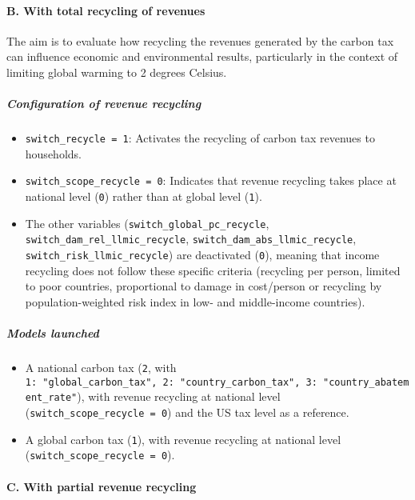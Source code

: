 \documentclass[
]{article}
\providecommand{\tightlist}{%
  \setlength{\itemsep}{0pt}\setlength{\parskip}{0pt}}
\begin{document}
\paragraph{B. With total recycling of
revenues}\label{b.-with-total-recycling-of-revenues}

The aim is to evaluate how recycling the revenues generated by the
carbon tax can influence economic and environmental results,
particularly in the context of limiting global warming to 2 degrees
Celsius.

\subparagraph{Configuration of revenue
recycling}\label{configuration-of-revenue-recycling}

\begin{itemize}
\tightlist
\item
  \texttt{switch\_recycle\ =\ 1}: Activates the recycling of carbon tax
  revenues to households.
\item
  \texttt{switch\_scope\_recycle\ =\ 0}: Indicates that revenue
  recycling takes place at national level (\texttt{0}) rather than at
  global level (\texttt{1}).
\item
  The other variables (\texttt{switch\_global\_pc\_recycle},
  \texttt{switch\_dam\_rel\_llmic\_recycle},
  \texttt{switch\_dam\_abs\_llmic\_recycle},
  \texttt{switch\_risk\_llmic\_recycle}) are deactivated (\texttt{0}),
  meaning that income recycling does not follow these specific criteria
  (recycling per person, limited to poor countries, proportional to
  damage in cost/person or recycling by population-weighted risk index
  in low- and middle-income countries).
\end{itemize}

\subparagraph{Models launched}\label{models-launched}

\begin{itemize}
\item
  A national carbon tax (\texttt{2}, with
  \texttt{1:\ "global\_carbon\_tax",\ 2:\ "country\_carbon\_tax",\ 3:\ "country\_abatement\_rate"}),
  with revenue recycling at national level
  (\texttt{switch\_scope\_recycle\ =\ 0}) and the US tax level as a
  reference.
\item
  A global carbon tax (\texttt{1}), with revenue recycling at national
  level (\texttt{switch\_scope\_recycle\ =\ 0}).
\end{itemize}

\paragraph{C. With partial revenue
recycling}\label{c.-with-partial-revenue-recycling}
\end{document}

